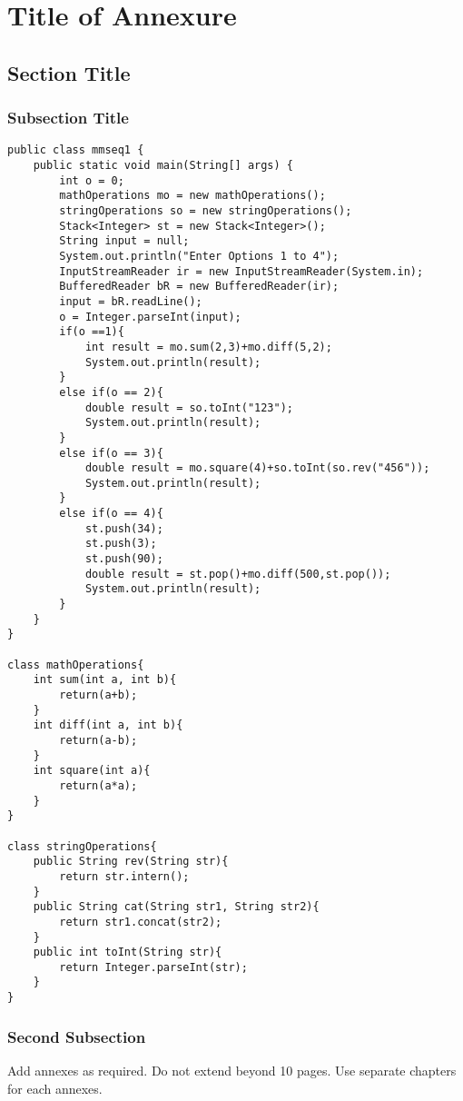 \setcounter{chapter}{0}

\renewcommand{\chaptername}{annexure}

\chapter{Title of Annexure}
\section{Section Title}
\subsection{Subsection Title}
\begin{lstlisting}
public class mmseq1 {
	public static void main(String[] args) {
		int o = 0;
		mathOperations mo = new mathOperations();
		stringOperations so = new stringOperations();
		Stack<Integer> st = new Stack<Integer>();		
		String input = null;
		System.out.println("Enter Options 1 to 4");
		InputStreamReader ir = new InputStreamReader(System.in);
		BufferedReader bR = new BufferedReader(ir);
		input = bR.readLine();
		o = Integer.parseInt(input);
		if(o ==1){
			int result = mo.sum(2,3)+mo.diff(5,2);
			System.out.println(result);
		}
		else if(o == 2){
			double result = so.toInt("123");
			System.out.println(result);
		}
		else if(o == 3){
			double result = mo.square(4)+so.toInt(so.rev("456"));
			System.out.println(result);
		}
		else if(o == 4){
			st.push(34);
			st.push(3);
			st.push(90);
			double result = st.pop()+mo.diff(500,st.pop());
			System.out.println(result);
		}	
	}
}

class mathOperations{
	int sum(int a, int b){
		return(a+b);
	}
	int diff(int a, int b){
		return(a-b);
	}
	int square(int a){
		return(a*a);
	}
}

class stringOperations{
	public String rev(String str){
		return str.intern();
	}
	public String cat(String str1, String str2){
		return str1.concat(str2);
	}
	public int toInt(String str){
		return Integer.parseInt(str);
	}
}

\end{lstlisting}
\newpage

\subsection{Second Subsection}
\par Add annexes as required. Do not extend beyond 10 pages. Use separate chapters for each annexes.

